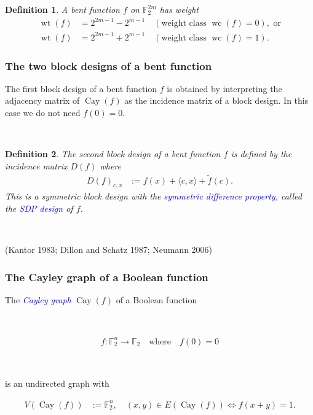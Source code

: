 \documentclass[pdf,sprung,slideColor,nocolorBG]{beamer}
\newenvironment{colortheme}[1]{
\def\ProvidesPackageRCS $##1${\relax}
\renewcommand{\ProcessOptions}{\relax}
\makeatletter

\makeatother
}{}
\newcommand{\slidecite}[1]{\tiny{(#1)}\normalsize{}}
\newcommand{\mb}[1]{\mathbb{#1}}
\newcommand{\Emph}[1]{\emph{\textcolor{blue}{#1}}}
\newcommand{\To}{\rightarrow}
\newcommand{\Cay}[1]{\operatorname{Cay}\left(#1\right)}
\newcommand{\dual}[1]{\widetilde{#1}}
\newcommand{\weight}[1]{\operatorname{wt}\left(#1\right)}
\newcommand{\weightclass}[1]{\operatorname{wc}\left(#1\right)}
\newcommand{\F}{\mb{F}}
\newtheorem{Def}{Definition}
\begin{document}
\begin{colortheme}{seagull}
\begin{colortheme}{jubata}
\begin{frame}
\begin{Def}
A bent function $f$ on $\F_2^{2m}$ has weight
\begin{align*}
\weight{f} &= 2^{2 m - 1} - 2^{m-1} \quad (\text{weight class~} \weightclass{f}=0), \text{~or}
\\
\weight{f} &= 2^{2 m - 1} + 2^{m-1} \quad (\text{weight class~} \weightclass{f}=1).
\end{align*}
\end{Def}
\end{frame}
\end{colortheme}

\begin{frame}
\frametitle{The two block designs of a bent function}

The first block design of a bent function $f$ is obtained by interpreting
the adjacency matrix of $\Cay{f}$ as the incidence matrix of a block design.
In this case we do not need $f(0)=0$.

~
\begin{Def}
The second block design of a bent function $f$ is defined by the incidence matrix
$D(f)$ where
\begin{align*}
D(f)_{c,x} &:= f(x) + \langle c, x \rangle + \dual{f}(c).
\end{align*}
This is a symmetric block design with the \Emph{symmetric difference property},
called the \Emph{SDP design} of $f$.
\end{Def}

~

\slidecite{Kantor 1983; Dillon and Schatz 1987; Neumann 2006}
\end{frame}

\begin{frame}
\frametitle{The Cayley graph of a Boolean function}
The \Emph{Cayley graph} $\Cay{f}$ of a Boolean function

~

\begin{align*}
%
f : \F_2^n \To \F_2 \quad \text{where} \quad f(0) = 0
%
\end{align*}

~

is
an undirected graph with

\begin{align*}
V(\Cay{f}) &:= \F_2^n, \quad (x,y) \in E(\Cay{f}) \Leftrightarrow f(x+y) = 1.
\end{align*}

~


\end{frame}
\end{colortheme}
\end{document}
